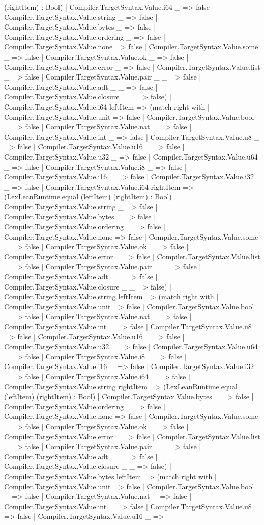 \documentclass[11pt]{article}
\begin{document}
(rightItem) : Bool) | Compiler.TargetSyntax.Value.i64 \_ => false | Compiler.TargetSyntax.Value.string \_ => false | Compiler.TargetSyntax.Value.bytes \_ => false | Compiler.TargetSyntax.Value.ordering \_ => false | Compiler.TargetSyntax.Value.none => false | Compiler.TargetSyntax.Value.some \_ => false | Compiler.TargetSyntax.Value.ok \_ => false | Compiler.TargetSyntax.Value.error \_ => false | Compiler.TargetSyntax.Value.list \_ => false | Compiler.TargetSyntax.Value.pair \_ \_ => false | Compiler.TargetSyntax.Value.adt \_ \_ => false | Compiler.TargetSyntax.Value.closure \_ \_ => false) | Compiler.TargetSyntax.Value.i64 leftItem => (match right with | Compiler.TargetSyntax.Value.unit => false | Compiler.TargetSyntax.Value.bool \_ => false | Compiler.TargetSyntax.Value.nat \_ => false | Compiler.TargetSyntax.Value.int \_ => false | Compiler.TargetSyntax.Value.u8 \_ => false | Compiler.TargetSyntax.Value.u16 \_ => false | Compiler.TargetSyntax.Value.u32 \_ => false | Compiler.TargetSyntax.Value.u64 \_ => false | Compiler.TargetSyntax.Value.i8 \_ => false | Compiler.TargetSyntax.Value.i16 \_ => false | Compiler.TargetSyntax.Value.i32 \_ => false | Compiler.TargetSyntax.Value.i64 rightItem => (LexLeanRuntime.equal (leftItem) (rightItem) : Bool) | Compiler.TargetSyntax.Value.string \_ => false | Compiler.TargetSyntax.Value.bytes \_ => false | Compiler.TargetSyntax.Value.ordering \_ => false | Compiler.TargetSyntax.Value.none => false | Compiler.TargetSyntax.Value.some \_ => false | Compiler.TargetSyntax.Value.ok \_ => false | Compiler.TargetSyntax.Value.error \_ => false | Compiler.TargetSyntax.Value.list \_ => false | Compiler.TargetSyntax.Value.pair \_ \_ => false | Compiler.TargetSyntax.Value.adt \_ \_ => false | Compiler.TargetSyntax.Value.closure \_ \_ => false) | Compiler.TargetSyntax.Value.string leftItem => (match right with | Compiler.TargetSyntax.Value.unit => false | Compiler.TargetSyntax.Value.bool \_ => false | Compiler.TargetSyntax.Value.nat \_ => false | Compiler.TargetSyntax.Value.int \_ => false | Compiler.TargetSyntax.Value.u8 \_ => false | Compiler.TargetSyntax.Value.u16 \_ => false | Compiler.TargetSyntax.Value.u32 \_ => false | Compiler.TargetSyntax.Value.u64 \_ => false | Compiler.TargetSyntax.Value.i8 \_ => false | Compiler.TargetSyntax.Value.i16 \_ => false | Compiler.TargetSyntax.Value.i32 \_ => false | Compiler.TargetSyntax.Value.i64 \_ => false | Compiler.TargetSyntax.Value.string rightItem => (LexLeanRuntime.equal (leftItem) (rightItem) : Bool) | Compiler.TargetSyntax.Value.bytes \_ => false | Compiler.TargetSyntax.Value.ordering \_ => false | Compiler.TargetSyntax.Value.none => false | Compiler.TargetSyntax.Value.some \_ => false | Compiler.TargetSyntax.Value.ok \_ => false | Compiler.TargetSyntax.Value.error \_ => false | Compiler.TargetSyntax.Value.list \_ => false | Compiler.TargetSyntax.Value.pair \_ \_ => false | Compiler.TargetSyntax.Value.adt \_ \_ => false | Compiler.TargetSyntax.Value.closure \_ \_ => false) | Compiler.TargetSyntax.Value.bytes leftItem => (match right with | Compiler.TargetSyntax.Value.unit => false | Compiler.TargetSyntax.Value.bool \_ => false | Compiler.TargetSyntax.Value.nat \_ => false | Compiler.TargetSyntax.Value.int \_ => false | Compiler.TargetSyntax.Value.u8 \_ => false | Compiler.TargetSyntax.Value.u16 \_ => 
\end{document}
